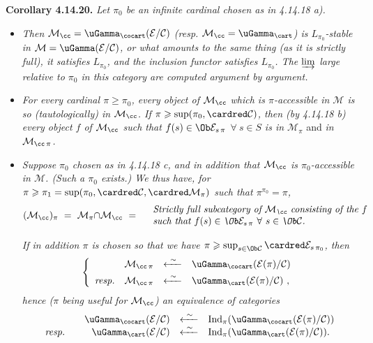 \textbf{Corollary 4.14.20.} \textit{Let $\pi_0$ be an infinite cardinal chosen as in 4.14.18 a).}
\begin{itemize}[leftmargin=2.5em]
\item[\circled{a}] \textit{Then $\mathcal{M}_{\cc} = \uGamma_{\cocart}(\mathcal{E}/\mathcal{C})$ (resp. $\mathcal{M}_{\cc} = \uGamma_{\cart}$) is $L_{\pi_0}$-stable in $\mathcal{M} = \uGamma(\mathcal{E}/\mathcal{C})$, or what amounts to the same thing (as it is strictly full), it satisfies $L_{\pi_0}$, and the inclusion functor satisfies $L_{\pi_0}$. The $\varinjlim$ large relative to $\pi_0$ in this category are computed argument by argument.}
\item[\circled{b}] \textit{For every cardinal $\pi \geqslant \pi_0$, every object of $\mathcal{M}_{\cc}$ which is $\pi$-accessible in $\mathcal{M}$ is so (tautologically) in $\mathcal{M}_{\cc}$. If $\pi \geqslant \sup(\pi_0, \cardred\mathcal{C})$, then (by 4.14.18 b) every object $f$ of $\mathcal{M}_{\cc}$ such that $f(s) \in \Ob\mathcal{E}_{s\,\pi}$ $\forall\ s \in S$} \textit{is in $\mathcal{M}_\pi$} \textup{and} \textit{in $\mathcal{M}_{\cc\,\pi}$.}


\item[\circled{c}] \textit{Suppose $\pi_0$ chosen as in 4.14.18 c, and in addition that $\mathcal{M}_{\cc}$ is $\pi_0$-accessible in $\mathcal{M}$. (Such a $\pi_0$ exists.) We thus have, for $\pi \geqslant \pi_1 = \sup(\pi_0, \cardred\mathcal{C}, \cardred\mathcal{M}_\pi)$ such that $\pi^{\pi_0} = \pi$,}
\[
(\mathcal{M}_{\cc})_\pi \ = \ \mathcal{M}_\pi{\cap}\mathcal{M}_{\cc} \ = \quad
\begin{array}{l}
\textit{Strictly full subcategory of $\mathcal{M}_{\cc}$ consisting of the $f$}\\
\textit{such that $f(s) \in \Ob\mathcal{E}_{s\,\pi}$ $\forall\ s \in \Ob\mathcal{C}$.}
\end{array}
\]

\textit{If in addition $\pi$ is chosen so that we have $\pi \geqslant \sup_{s\in\Ob\mathcal{C}} \cardred\mathcal{E}_{s\,\pi_0}$, then}
\[
\left\{
\begin{array}{rrcl}
 & \mathcal{M}_{\cc\,\pi} & \xleftarrow{\ \sim\ } & \uGamma_{\cocart}(\mathcal{E}(\pi)/\mathcal{C})\\[1ex]
\textit{resp.} & \mathcal{M}_{\cc\,\pi} & \xleftarrow{\ \sim\ } & \uGamma_{\cart}(\mathcal{E}(\pi)/\mathcal{C}) \ ,
\end{array}
\right.
\]
\textit{hence ($\pi$ being useful for $\mathcal{M}_{\cc}$) an equivalence of categories}
\[
\begin{array}{rrcl}
 & \uGamma_{\cocart}(\mathcal{E}/\mathcal{C}) & \xleftarrow{\ \sim\ } & \mathrm{Ind}_\pi(\uGamma_{\cocart}(\mathcal{E}(\pi)/\mathcal{C}))\\
\textit{resp.}\quad & \uGamma_{\cart}(\mathcal{E}/\mathcal{C}) & \xleftarrow{\ \sim\ } & \mathrm{Ind}_\pi(\uGamma_{\cart}(\mathcal{E}(\pi)/\mathcal{C})).
\end{array}
\]
\end{itemize}

